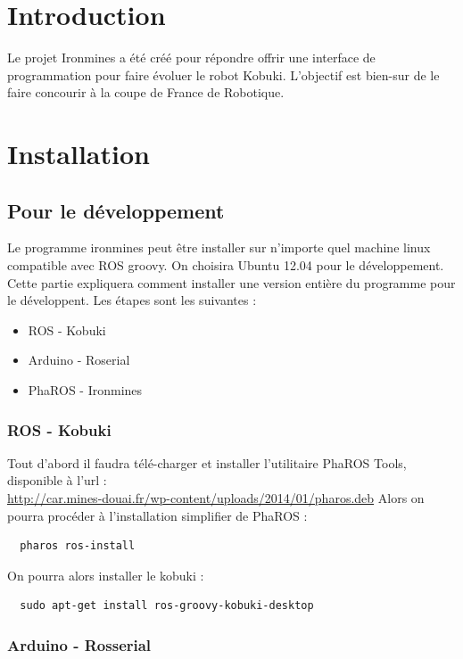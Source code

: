 \documentclass[a4paper, 11pt]{article}
\begin{document}
\section{Introduction}

Le projet Ironmines a été créé pour répondre offrir une interface de
programmation pour faire évoluer le robot Kobuki. L'objectif est
bien-sur de le faire concourir à la coupe de France de Robotique.

\section{Installation}
\subsection{Pour le développement}
Le programme ironmines peut être installer sur n'importe quel machine
linux compatible avec ROS groovy. On choisira Ubuntu 12.04 pour le
développement. Cette partie expliquera comment installer une version
entière du programme pour le développent. Les étapes sont les
suivantes :
\begin{itemize}
\item ROS - Kobuki
\item Arduino - Roserial
\item PhaROS - Ironmines
\end{itemize}

\subsubsection{ROS - Kobuki}

Tout d'abord il faudra télé-charger et installer l'utilitaire PhaROS
Tools, disponible à l'url :\\
\url{http://car.mines-douai.fr/wp-content/uploads/2014/01/pharos.deb}
Alors on pourra procéder à l'installation simplifier de PhaROS :

\begin{verbatim}
  pharos ros-install
\end{verbatim}
On pourra alors installer le kobuki :
\begin{verbatim}
  sudo apt-get install ros-groovy-kobuki-desktop
\end{verbatim}

\subsubsection{Arduino - Rosserial}
\end{document}
